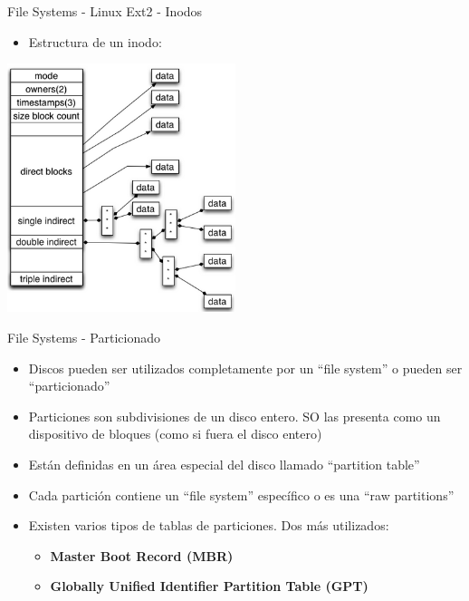 \begin{frame}{File Systems - Linux Ext2 - Inodos}
 \begin{itemize}
  \item Estructura de un inodo:
 \end{itemize} 
 \begin{center}
  \includegraphics[width=0.5\textwidth]{images/inode1.png}
 \end{center}
\end{frame}

\begin{frame}{File Systems - Particionado}
 \begin{itemize}
  \item Discos pueden ser utilizados completamente por un ``file system'' o pueden ser ``particionado''
  \item Particiones son subdivisiones de un disco entero. SO las presenta como un dispositivo de bloques 
    (como si fuera el disco entero)
  \item Están definidas en un área especial del disco llamado ``partition table''
  \item Cada partición contiene un ``file system'' específico o es una ``raw partitions''
  \item Existen varios tipos de tablas de particiones. Dos más utilizados:
  \begin{itemize}
   \item {\bf Master Boot Record (MBR)}
   \item {\bf Globally Unified Identifier Partition Table (GPT)}
  \end{itemize}
 \end{itemize}
\end{frame}

